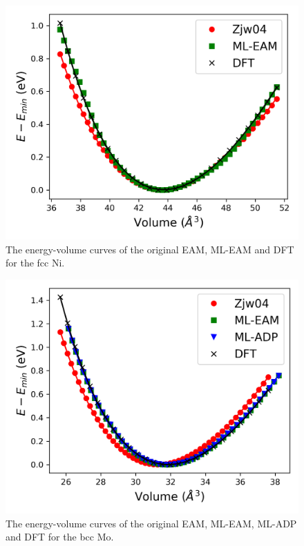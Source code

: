 \documentclass[prb,reprint,superscriptaddress]{revtex4-2}
\begin{document}
% 
%
\begin{figure}
\centering
\includegraphics[scale=0.65]{Ni_all_eos.png}
\caption{\label{fig:Ni_eos} The energy-volume curves of the original EAM, 
ML-EAM and DFT for the fcc Ni.}
\end{figure}

% 
%
\begin{figure}
\centering
\includegraphics[scale=0.65]{Mo_all_eos.png}
\caption{\label{fig:Mo_eos} The energy-volume curves of the original EAM, 
ML-EAM, ML-ADP and DFT for the bcc Mo.}
\end{figure}
\end{document}
